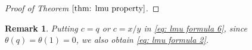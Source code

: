 \documentclass[a4paper]{article}
\newcommand{\hyper}[4]{\left( \begin{matrix} #1 \\ #2 \end{matrix};#3;#4\right)}
\numberwithin{equation}{section}
\theoremstyle{plain}
\newtheorem{rmk}{Remark}
\begin{document}
\begin{proof}[Proof of Theorem $\ref{thm: lmu property}$]
%


\end{proof}

\begin{rmk}
Putting $c=q$ or $c=x/y$ in \eqref{eq: lmu formula 6}, since $\theta(q)=\theta(1)=0$, we also obtain \eqref{eq: lmu formula 2}. 
\end{rmk}
\end{document}

